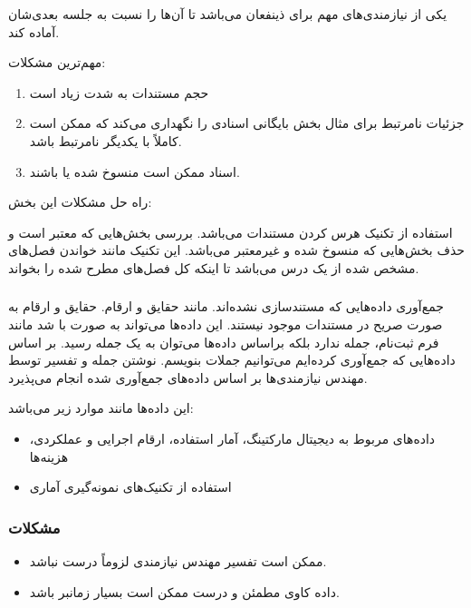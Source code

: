 یکی از نیازمندی‌های مهم برای ذینفعان می‌باشد تا آن‌ها را نسبت به جلسه بعدی‌شان
آماده کند.

مهم‌ترین مشکلات:

\begin{enumerate}
    \item حجم مستندات به شدت زیاد است
    \item جزئیات نامرتبط برای مثال بخش بایگانی اسنادی را نگهداری می‌کند که ممکن
    است کاملاً با یکدیگر نامرتبط باشد.
    \item اسناد ممکن است منسوخ شده یا  باشند.
\end{enumerate}

راه حل مشکلات این بخش:

استفاده از تکنیک هرس کردن مستندات می‌باشد. بررسی بخش‌هایی که معتبر است و حذف
بخش‌هایی که منسوخ شده و غیرمعتبر می‌باشد. این تکنیک مانند خواندن فصل‌های مشخص
شده از یک درس می‌باشد تا اینکه کل فصل‌های مطرح شده را بخواند.

\subsubsection{}

جمع‌آوری داده‌هایی که مستندسازی نشده‌اند. مانند حقایق و ارقام. حقایق و ارقام به
صورت صریح در مستندات موجود نیستند. این داده‌ها می‌تواند به صورت 
با شد مانند فرم ثبت‌نام، جمله ندارد بلکه براساس داده‌ها می‌توان به یک جمله رسید.
بر اساس داده‌هایی که جمع‌آوری کرده‌ایم می‌توانیم جملات  بنویسم.
نوشتن جمله و تفسیر توسط مهندس نیازمندی‌ها بر اساس داده‌های جمع‌آوری شده انجام
می‌پذیرد.

این داده‌ها مانند موارد زیر می‌باشد:

\begin{itemize}
    \item داده‌های مربوط به دیجیتال مارکتینگ، آمار استفاده، ارقام اجرایی و
    عملکردی، هزینه‌ها
    \item استفاده از تکنیک‌های نمونه‌گیری آماری
\end{itemize}

\subsubsection*{مشکلات}

\begin{itemize}
    \item ممکن است تفسیر مهندس نیازمندی لزوماً درست نباشد.
    \item داده کاوی مطمئن و درست ممکن است بسیار زمانبر باشد.
\end{itemize}

